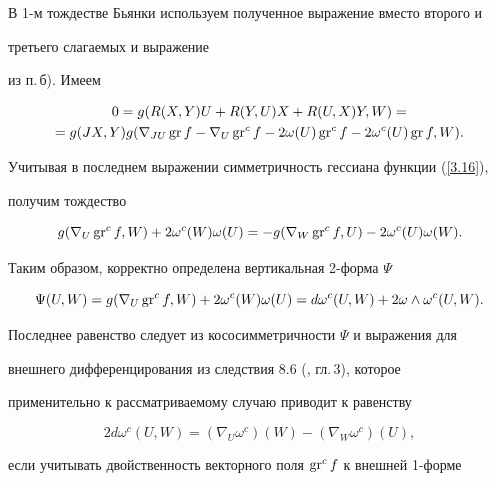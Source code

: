 В 1-м тождестве Бьянки используем полученное выражение вместо второго и


третьего слагаемых и выражение


из п.\,б). Имеем


\begin{gather*}


0=g(R(X,Y)U+R(Y,U)X+R(U,X)Y,W)=\\


=g(JX,Y)g(\nabla_{JU}\GR f-\nabla_U\gr^c f-2\omega (U)\gr^c f-


2\omega^c(U)\GR f,W).


\end{gather*}


Учитывая в последнем выражении симметричность гессиана функции (\ref{3.16}),


получим тождество


$$


g(\nabla_U\gr^c f,W)+2\omega^c(W)\omega (U)=-g(\nabla_W\gr^c f,U)


-2\omega^c(U)\omega (W).


$$


Таким образом, корректно определена вертикальная 2-форма $\Psi$


\begin{equation}


\Psi (U,W)=g(\nabla_U\gr^c f,W)+2\omega^c(W)\omega (U)=


d\omega^c(U,W)+2\omega \land \omega^c(U,W).


\label{3.18}


\end{equation}


Последнее равенство следует из кососимметричности $\Psi $ и выражения для


внешнего дифференцирования из следствия 8.6 (\cite{KN1}, гл.\,3), которое


применительно к рассматриваемому случаю приводит к равенству


$$




2d\omega^c(U,W)=(\nabla_U\omega^c)(W)-(\nabla_W\omega^c)(U),


\label{3.19}




$$


если учитывать двойственность векторного поля $\operatorname{gr}^c f$ к внешней 1-форме


